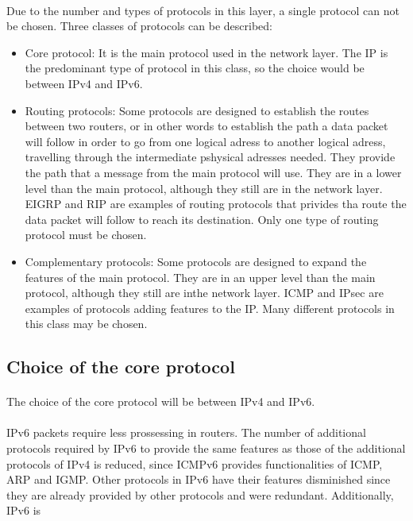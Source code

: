 \documentclass[12pt,a4paper]{report}
\begin{document}
\paragraph{}Due to the number and types of protocols in this layer, a single protocol can not be chosen. Three classes of protocols can be described:
\begin{itemize}
	\item Core protocol: It is the main protocol used in the network layer. The IP is the predominant type of protocol in this class, so the choice would be between IPv4 and IPv6.
	\item Routing protocols: Some protocols are designed to establish the routes between two routers, or in other words to establish the path a data packet will follow in order to go from one logical adress to another logical adress, travelling through the intermediate pshysical adresses needed. They provide the path that a message from the main protocol will use. They are in a lower level than the main protocol, although they still are in the network layer. EIGRP and RIP are examples of routing protocols that privides tha route the data packet will follow to reach its destination. Only one type of routing protocol must be chosen.
	\item Complementary protocols: Some protocols are designed to expand the features of the main protocol. They are in an upper level than the main protocol, although they still are inthe network layer. ICMP and IPsec are examples of protocols adding features to the IP. Many different protocols in this class may be chosen.
\end{itemize}

\subsection{Choice of the core protocol}
\paragraph{}The choice of the core protocol will be between IPv4 and IPv6.
\paragraph{}IPv6 packets require less prossessing in routers. The number of additional protocols required by IPv6 to provide the same features as those of the additional protocols of IPv4 is reduced, since ICMPv6 provides functionalities of ICMP, ARP and IGMP. Other protocols in IPv6 have their features disminished since they are already provided by other protocols and were redundant. Additionally, IPv6 is
\end{document}
